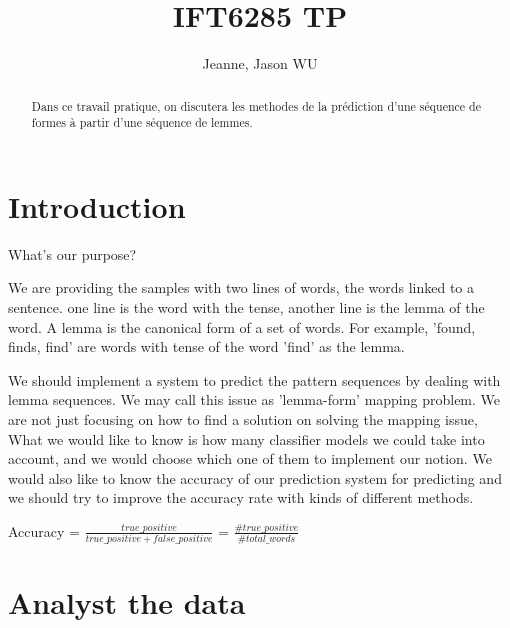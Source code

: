 \documentclass[a4paper]{article}
\title{IFT6285 TP}
\author{Jeanne, Jason WU}
\begin{document}
\maketitle

\begin{abstract}
Dans ce travail pratique,  on discutera les methodes de la prédiction d'une séquence de formes à partir d'une séquence de lemmes.
\end{abstract}

\section{Introduction}
What's our purpose?

We are providing the samples with two lines of words, the words linked to a sentence. one line is the word with the tense, another line is the lemma of the word. A lemma is the canonical form of a set of words. For example, 'found, finds, find' are words with tense of the word 'find' as the lemma.

We should implement a system to predict the pattern sequences by dealing with lemma sequences. We may call this issue as 'lemma-form' mapping problem. We are not just focusing on how to find a solution on solving the mapping issue, What we would like to know is how many classifier models we could take into account, and we would choose which one of them to implement our notion. We would also like to know the accuracy of our prediction system for predicting and we should try to improve the accuracy rate with kinds of different methods.

Accuracy = $\frac{true\_positive}{true\_positive + false\_positive}$ = $\frac{\#true\_positive}{\#total\_words}$

\section{Analyst the data}
\end{document}
